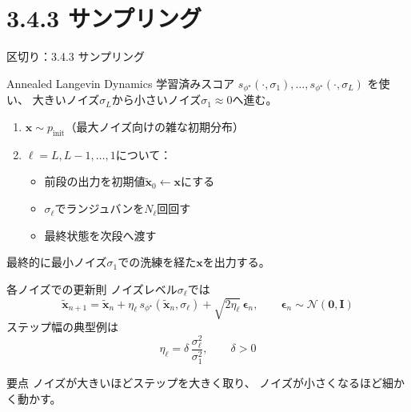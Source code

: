 \section{3.4.3 サンプリング}
\asmain
\begin{frame}{区切り：3.4.3 サンプリング}
    \tableofcontents[currentsection]
\end{frame}
\asmain
\begin{frame}{Annealed Langevin Dynamics}
    学習済みスコア
    $s_{\phi^\star}(\cdot,\sigma_1),\ldots,s_{\phi^\star}(\cdot,\sigma_L)$
    を使い、
    大きいノイズ$\sigma_L$から小さいノイズ$\sigma_1\approx 0$へ進む。
    \begin{enumerate}
        \item $\bm{x}\sim p_{\mathrm{init}}$（最大ノイズ向けの雑な初期分布）
        \item $\ell=L,L-1,\ldots,1$について：
        \begin{itemize}
            \item 前段の出力を初期値$\tilde{\bm{x}}_0\leftarrow\bm{x}$にする
            \item $\sigma_\ell$でランジュバンを$N_\ell$回回す
            \item 最終状態を次段へ渡す
        \end{itemize}
    \end{enumerate}
    最終的に最小ノイズ$\sigma_1$での洗練を経た$\bm{x}$を出力する。
\end{frame}
\asmain
\begin{frame}{各ノイズでの更新則}
    ノイズレベル$\sigma_\ell$では
    \[
        \tilde{\bm{x}}_{n+1}
        =
        \tilde{\bm{x}}_n
        +
        \eta_\ell\,s_{\phi^\star}(\tilde{\bm{x}}_n,\sigma_\ell)
        +
        \sqrt{2\eta_\ell}\,\bm{\epsilon}_n,
        \qquad
        \bm{\epsilon}_n\sim\mathcal{N}(\bm{0},\bm{I})
    \]
    ステップ幅の典型例は
    \[
        \eta_\ell
        =
        \delta\,\frac{\sigma_\ell^{2}}{\sigma_1^{2}},
        \qquad
        \delta>0
    \]
    \begin{block}{要点}
        ノイズが大きいほどステップを大きく取り、
        ノイズが小さくなるほど細かく動かす。
    \end{block}
\end{frame}
\assuppl

